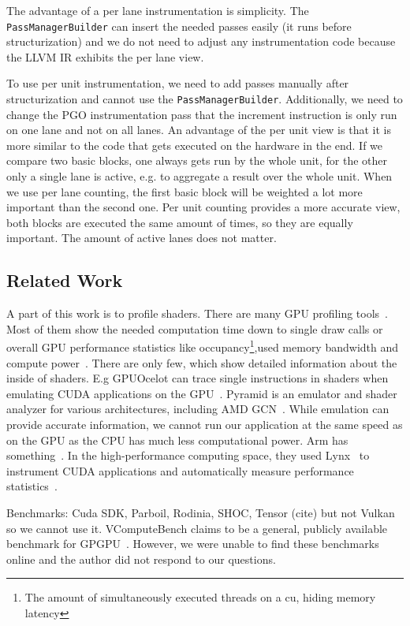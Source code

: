 The advantage of a per lane instrumentation is simplicity. The \texttt{PassManagerBuilder} can insert the needed passes easily (it runs before structurization) and we do not need to adjust any instrumentation code because the LLVM IR exhibits the per lane view.

To use per unit instrumentation, we need to add passes manually after structurization and cannot use the \texttt{PassManagerBuilder}.
Additionally, we need to change the PGO instrumentation pass that the increment instruction is only run on one lane and not on all lanes.
An advantage of the per unit view is that it is more similar to the code that gets executed on the hardware in the end.
If we compare two basic blocks, one always gets run by the whole unit, for the other only a single lane is active, e.g. to aggregate a result over the whole unit.
When we use per lane counting, the first basic block will be weighted a lot more important than the second one.
Per unit counting provides a more accurate view, both blocks are executed the same amount of times, so they are equally important. The amount of active lanes does not matter.

\subsection{Related Work}
\label{sub:relatedwork}
A part of this work is to profile shaders. There are many GPU profiling tools~\cite{UnityGPUProfiler, UnrealGPUProfiling, MSGPUUsage, PGI2014}.
Most of them show the needed computation time down to single draw calls or overall GPU performance statistics like occupancy\footnote{The amount of simultaneously executed threads on a \gls{cu}, hiding memory latency},used memory bandwidth and compute power~\cite{NvidiaNsight, NvidiaShaderPerf, AMDShaderAnalyzer}.
There are only few, which show detailed information about the inside of shaders. E.g GPUOcelot can trace single instructions in shaders when emulating CUDA applications on the GPU~\cite{GPUOcelot, Lakshminarayana2010}. Pyramid is an emulator and shader analyzer for various architectures, including AMD GCN~\cite{Pyramid}.
While emulation can provide accurate information, we cannot run our application at the same speed as on the GPU as the CPU has much less computational power.
Arm has something~\cite{Barton2013}.
In the high-performance computing space, they used Lynx~\cite{Lynx} to instrument CUDA applications and automatically measure performance statistics~\cite{Farooqui2014}.

Benchmarks: Cuda SDK, Parboil, Rodinia, SHOC, Tensor (cite) but not Vulkan so we cannot use it. VComputeBench claims to be a general, publicly available benchmark for GPGPU~\cite{Mammeri2018}. However, we were unable to find these benchmarks online and the author did not respond to our questions.


